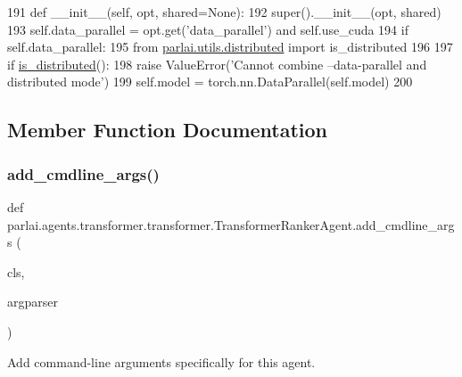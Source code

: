 \begin{DoxyCode}
191     \textcolor{keyword}{def }\_\_init\_\_(self, opt, shared=None):
192         super().\_\_init\_\_(opt, shared)
193         self.data\_parallel = opt.get(\textcolor{stringliteral}{'data\_parallel'}) \textcolor{keywordflow}{and} self.use\_cuda
194         \textcolor{keywordflow}{if} self.data\_parallel:
195             \textcolor{keyword}{from} \hyperlink{namespaceparlai_1_1utils_1_1distributed}{parlai.utils.distributed} \textcolor{keyword}{import} is\_distributed
196 
197             \textcolor{keywordflow}{if} \hyperlink{namespaceparlai_1_1utils_1_1distributed_a023acb5e3b66e1f27e21247c35661279}{is\_distributed}():
198                 \textcolor{keywordflow}{raise} ValueError(\textcolor{stringliteral}{'Cannot combine --data-parallel and distributed mode'})
199             self.model = torch.nn.DataParallel(self.model)
200 
\end{DoxyCode}


\subsection{Member Function Documentation}
\mbox{\label{classparlai_1_1agents_1_1transformer_1_1transformer_1_1TransformerRankerAgent_a6836668a4c2394d7217631fed533a7ac}} 
\subsubsection{\texorpdfstring{add\+\_\+cmdline\+\_\+args()}{add\_cmdline\_args()}}
{\footnotesize\ttfamily def parlai.\+agents.\+transformer.\+transformer.\+Transformer\+Ranker\+Agent.\+add\+\_\+cmdline\+\_\+args (\begin{DoxyParamCaption}\item[{}]{cls,  }\item[{}]{argparser }\end{DoxyParamCaption})}

\begin{DoxyVerb}Add command-line arguments specifically for this agent.
\end{DoxyVerb}
 

